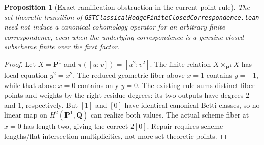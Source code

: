 \documentclass[11pt]{article}
\newtheorem{proposition}{Proposition}
\newcommand{\Q}{\mathbf Q}
\newcommand{\PP}{\mathbf P}
\begin{document}
\begin{proposition}[Exact ramification obstruction in the current point rule]
The set-theoretic transition of \texttt{GSTClassicalHodgeFiniteClosedCorrespondence.lean} need not induce a canonical cohomology operator for an arbitrary finite correspondence, even when the underlying correspondence is a genuine closed subscheme finite over the first factor.
\end{proposition}
\begin{proof}
Let \(X=\PP^1\) and \(\pi([u:v])=[u^2:v^2]\). The finite relation \(X\times_{\PP^1}X\) has local equation \(y^2=x^2\). The reduced geometric fiber above \(x=1\) contains \(y=\pm1\), while that above \(x=0\) contains only \(y=0\). The existing rule sums distinct fiber points and weights by the right residue degrees: its two outputs have degrees \(2\) and \(1\), respectively. But \([1]\) and \([0]\) have identical canonical Betti classes, so no linear map on \(H^2(\PP^1,\Q)\) can realize both values. The actual scheme fiber at \(x=0\) has length two, giving the correct \(2[0]\). Repair requires scheme lengths/flat intersection multiplicities, not more set-theoretic points.
\end{proof}
\end{document}
